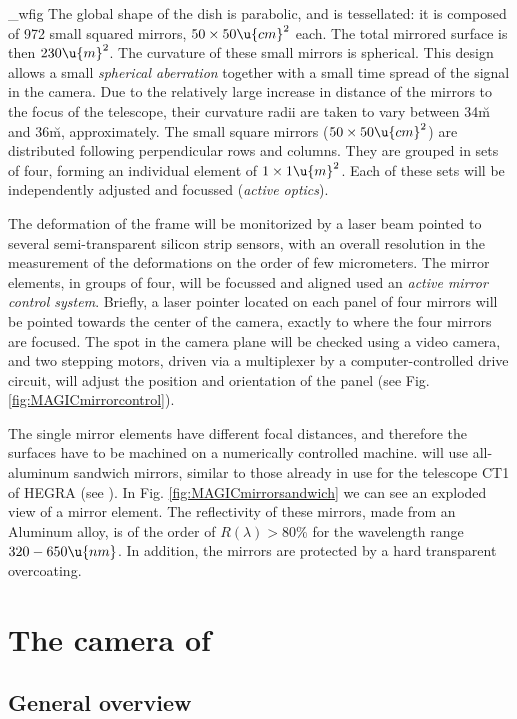 \MAGICmirrorcontrol_wfig
%
The global shape of the dish is parabolic, and is tessellated: it is
composed of 972 small squared mirrors, $50\times 50 \u{cm}^2$ each.
The total mirrored surface is then $230\u{m}^2$. The curvature of
these small mirrors is spherical.  This design allows a small
\emph{spherical aberration} together with a small time spread of the
signal in the camera. Due to the relatively large increase in distance
of the mirrors to the focus of the telescope, their curvature radii
are taken to vary between 34\u{m} and 36\u{m}, approximately.  The
small square mirrors ($50\times 50 \u{cm}^2$) are distributed
following perpendicular rows and columns. They are grouped in sets of
four, forming an individual element of $1\times 1 \u{m}^2$.  Each of
these sets will be independently adjusted and focussed (\emph{active
  optics}).

The deformation of the frame will be monitorized by a laser beam
pointed to several semi-transparent silicon strip sensors, with an
overall resolution in the measurement of the deformations on the order
of few micrometers. The mirror elements, in groups of four, will be
focussed and aligned used an \emph{active mirror control
  system}\label{label:amcs}.  Briefly, a laser pointer located on each
panel of four mirrors will be pointed towards the center of the
camera, exactly to where the four mirrors are focused. The spot in the
camera plane will be checked using a video camera, and two stepping
motors, driven via a multiplexer by a computer-controlled drive
circuit, will adjust the position and orientation of the panel (see
Fig.\ref{fig:MAGICmirrorcontrol}).

\label{label:mirrorelement}%
The single mirror elements have different focal distances, and
therefore the surfaces have to be machined on a numerically controlled
machine. \MAGIC will use all-aluminum sandwich mirrors, similar to
those already in use for the telescope CT1 of HEGRA (see
). In Fig. \ref{fig:MAGICmirrorsandwich} we
can see an exploded view of a mirror element. The reflectivity of
these mirrors, made from an Aluminum alloy, is of the order of
$R(\lambda) > 80\%$ for the wavelength range $320-650\u{nm}$. In
addition, the mirrors are protected by a hard transparent overcoating.

\section{The camera of \MAGIC}

\subsection{General overview}

